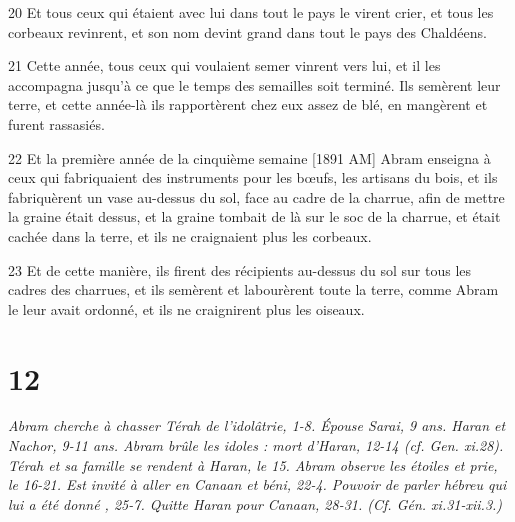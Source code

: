 \par 20 Et tous ceux qui étaient avec lui dans tout le pays le virent crier, et tous les corbeaux revinrent, et son nom devint grand dans tout le pays des Chaldéens.
\par 21 Cette année, tous ceux qui voulaient semer vinrent vers lui, et il les accompagna jusqu'à ce que le temps des semailles soit terminé. Ils semèrent leur terre, et cette année-là ils rapportèrent chez eux assez de blé, en mangèrent et furent rassasiés.
\par 22 Et la première année de la cinquième semaine [1891 AM] Abram enseigna à ceux qui fabriquaient des instruments pour les bœufs, les artisans du bois, et ils fabriquèrent un vase au-dessus du sol, face au cadre de la charrue, afin de mettre la graine était dessus, et la graine tombait de là sur le soc de la charrue, et était cachée dans la terre, et ils ne craignaient plus les corbeaux.
\par 23 Et de cette manière, ils firent des récipients au-dessus du sol sur tous les cadres des charrues, et ils semèrent et labourèrent toute la terre, comme Abram le leur avait ordonné, et ils ne craignirent plus les oiseaux.

\chapter{12}

\par \textit{Abram cherche à chasser Térah de l'idolâtrie, 1-8. Épouse Sarai, 9 ans. Haran et Nachor, 9-11 ans. Abram brûle les idoles : mort d'Haran, 12-14 (cf. Gen. xi.28). Térah et sa famille se rendent à Haran, le 15. Abram observe les étoiles et prie, le 16-21. Est invité à aller en Canaan et béni, 22-4. Pouvoir de parler hébreu qui lui a été donné , 25-7. Quitte Haran pour Canaan, 28-31. (Cf. Gén. xi.31-xii.3.)}

